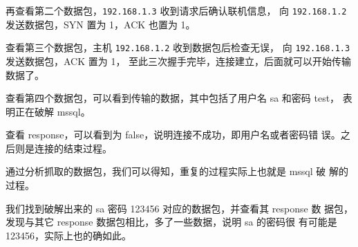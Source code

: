 再查看第二个数据包，\texttt{192.168.1.3} 收到请求后确认联机信息，
向 \texttt{192.168.1.2} 发送数据包，SYN 置为 1，ACK 也置为 1。

查看第三个数据包，主机 \texttt{192.168.1.2} 收到数据包后检查无误，
向 \texttt{192.168.1.3} 发送数据包，ACK 置为 1，
至此三次握手完毕，连接建立，后面就可以开始传输数据了。

查看第四个数据包，可以看到传输的数据，其中包括了用户名 sa 和密码 test，
表明正在破解 mssql。

查看 response，可以看到为 false，说明连接不成功，即用户名或者密码错
误。之后则是连接的结束过程。

通过分析抓取的数据包，我们可以得知，重复的过程实际上也就是 mssql 破
解的过程。

我们找到破解出来的 sa 密码 123456 对应的数据包，并查看其 response 数
据包，发现与其它 response 数据包相比，多了一些数据，说明 sa 的密码很
有可能是 123456，实际上也的确如此。
%
